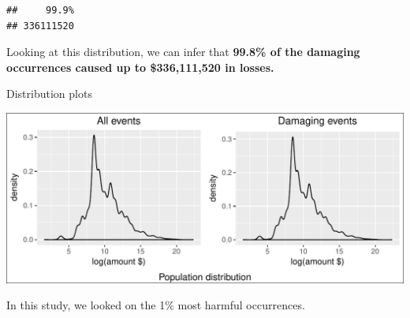 \documentclass[]{article}
\begin{document}
\begin{verbatim}
##     99.9% 
## 336111520
\end{verbatim}

Looking at this distribution, we can infer that \textbf{99.8\% of the
damaging occurrences caused up to \$336,111,520 in losses.}

Distribution plots

\includegraphics{readme_files/figure-latex/crop-distr-4-1.pdf}

In this study, we looked on the 1\% most harmful occurrences.
\end{document}
